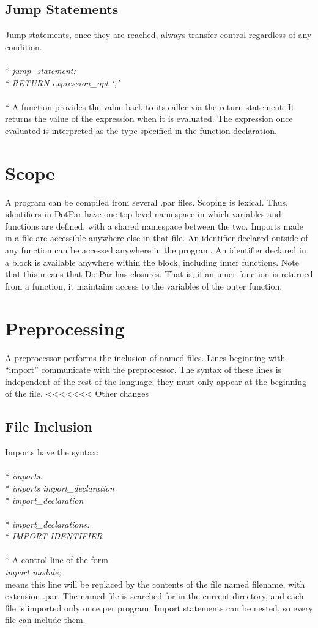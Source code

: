 \documentclass[11pt]{article}
\newcommand{\tab}{\hspace*{2em}}
\begin{document}
\subsection{Jump Statements}
Jump statements, once they are reached, always transfer control regardless of any condition.
\\ \\* \tab \emph{jump\_statement:}
\\* \tab \tab \emph{RETURN expression\_opt `;'}
\\ \\* A function provides the value back to its caller via the return statement. It returns the value of the expression when it is evaluated. The expression once evaluated is interpreted as the type specified in the function declaration.

\section{Scope}
A program can be compiled from several .par files. Scoping is lexical. Thus, identifiers in DotPar have one top-level namespace in which variables and functions are defined, with a shared namespace between the two. Imports made in a file are accessible anywhere else in that file. An identifier declared outside of any function can be accessed anywhere in the program. An identifier declared in a block is available anywhere within the block, including inner functions. Note that this means that DotPar has closures. That is, if an inner function is returned from a function, it maintains access to the variables of the outer function.

\section{Preprocessing}
A preprocessor performs the inclusion of named files. Lines beginning with “import” communicate with the preprocessor. The syntax of these lines is independent of the rest of the language; they must only appear at the beginning of the file.
<<<<<<< Other changes
\subsection{File Inclusion}
Imports have the syntax:
\\ \\* \tab \emph{imports:}
\\* \tab \tab \emph{imports import\_declaration}
\\* \tab \tab \emph{import\_declaration}
\\ \\* \tab \emph{import\_declarations:}
\\* \tab \tab \emph{IMPORT IDENTIFIER}
\\ \\* A control line of the form
\\ \tab \emph{import module;}
\\ means this line will be replaced by the contents of the file named filename, with extension .par. The named file is searched for in the current directory, and each file is imported only once per program. Import statements can be nested, so every file can include them.
\end{document}
